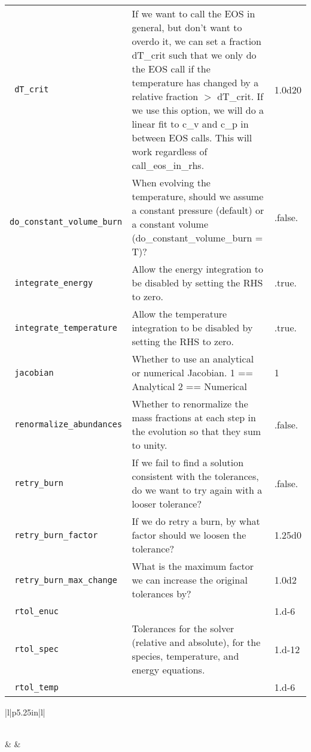 \begin{landscape}
{\begin{center}
\begin{longtable}{|l|p{5.25in}|l|}
\rowcolor{tableShade}
\verb= dT_crit = &  If we want to call the EOS in general, but don't want to overdo it, we can set a fraction dT\_crit such that we only do the EOS call if the temperature has changed by a relative fraction $>$ dT\_crit. If we use this option, we will do a linear fit to c\_v and c\_p in between EOS calls. This will work regardless of call\_eos\_in\_rhs. & 1.0d20 \\
\verb= do_constant_volume_burn = &  When evolving the temperature, should we assume a constant pressure (default) or a constant volume (do\_constant\_volume\_burn = T)? & .false. \\
\rowcolor{tableShade}
\verb= integrate_energy = &  Allow the energy integration to be disabled by setting the RHS to zero. & .true. \\
\verb= integrate_temperature = &  Allow the temperature integration to be disabled by setting the RHS to zero. & .true. \\
\rowcolor{tableShade}
\verb= jacobian = &  Whether to use an analytical or numerical Jacobian. 1 == Analytical 2 == Numerical & 1 \\
\verb= renormalize_abundances = &  Whether to renormalize the mass fractions at each step in the evolution so that they sum to unity. & .false. \\
\rowcolor{tableShade}
\verb= retry_burn = &  If we fail to find a solution consistent with the tolerances, do we want to try again with a looser tolerance? & .false. \\
\verb= retry_burn_factor = &  If we do retry a burn, by what factor should we loosen the tolerance? & 1.25d0 \\
\rowcolor{tableShade}
\verb= retry_burn_max_change = &  What is the maximum factor we can increase the original tolerances by? & 1.0d2 \\
\verb= rtol_enuc = &  & 1.d-6 \\
\rowcolor{tableShade}
\verb= rtol_spec = &  Tolerances for the solver (relative and absolute), for the species, temperature, and energy equations. & 1.d-12 \\
\verb= rtol_temp = &  & 1.d-6 \\


\end{longtable}
\end{center}

} %


{\small

\renewcommand{\arraystretch}{1.5}
%
\begin{center}
\begin{longtable}{|l|p{5.25in}|l|}
\caption[kpp parameters.]{kpp parameters.} \label{table: kpp runtime} \\
%
\hline {} &
        &
        \\ \hline
\endfirsthead


\end{longtable}
\end{center}}
\end{landscape}
